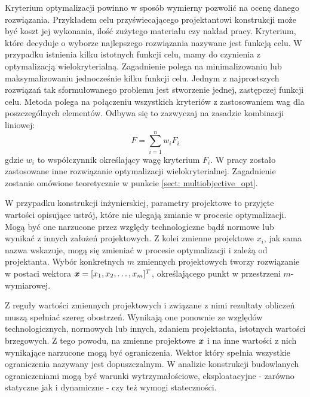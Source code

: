 Kryterium optymalizacji powinno w sposób wymierny pozwolić na ocenę danego rozwiązania. Przykładem celu przyświecającego projektantowi konstrukcji może być koszt jej wykonania, ilość zużytego materiału czy nakład pracy. Kryterium, które decyduje o wyborze najlepszego rozwiązania nazywane jest funkcją celu. W przypadku istnienia kilku istotnych funkcji celu, mamy do czynienia z optymalizacją wielokryterialną. Zagadnienie polega na minimalizowaniu lub maksymalizowaniu jednocześnie kilku funkcji celu. Jednym z najprostszych rozwiązań tak sformułowanego problemu jest stworzenie jednej, zastępczej funkcji celu. Metoda polega na połączeniu wszystkich kryteriów z zastosowaniem wag dla poszczególnych elementów. Odbywa się to zazwyczaj na zasadzie kombinacji liniowej:
\begin{equation}
	F=\sum_{i=1}^{n}w_i F_i
\end{equation}
gdzie $w_i$ to współczynnik określający wagę kryterium $F_i$. W pracy zostało zastosowane inne rozwiązanie optymalizacji wielokryterialnej. Zagadnienie zostanie omówione teoretycznie w punkcie \ref{sect: multiobjective_opt}. 

W przypadku konstrukcji inżynierskiej, parametry projektowe to przyjęte wartości opisujące ustrój, które nie ulegają zmianie w procesie optymalizacji.  Mogą być one narzucone przez względy technologiczne bądź normowe \parencite{Szymczak1995} lub wynikać z innych założeń projektowych. Z kolei zmienne projektowe $x_i$, jak sama nazwa wskazuje, mogą się zmieniać w procesie optymalizacji i zależą od projektanta. Wybór konkretnych $m$ zmiennych projektowych tworzy rozwiązanie w postaci wektora $\bm{x}=[x_1,x_2,\dots,x_m]^T$, określającego punkt w przestrzeni $m$-wymiarowej.

Z reguły wartości zmiennych projektowych i związane z nimi rezultaty obliczeń muszą spełniać szereg obostrzeń. Wynikają one ponownie ze względów technologicznych, normowych lub innych, zdaniem projektanta, istotnych wartości brzegowych. Z tego powodu, na zmienne projektowe $\bm{x}$ i na inne wartości z nich wynikające narzucone mogą być ograniczenia. Wektor który spełnia wszystkie ograniczenia nazywany jest dopuszczalnym. W analizie konstrukcji budowlanych ograniczeniami mogą być warunki wytrzymałościowe, eksploatacyjne - zarówno statyczne jak i dynamiczne - czy też wymogi stateczności.



